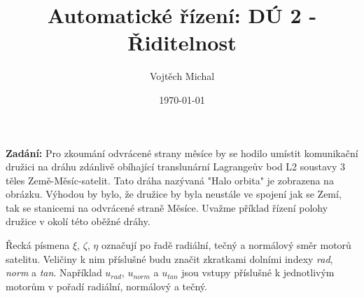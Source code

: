 \documentclass[twoside]{article}
\title{Automatické řízení: DÚ 2 - Řiditelnost}
\author{Vojtěch Michal}
\date{\today}
\begin{document}
\maketitle


\newcommand{\rad}{{rad}}
\renewcommand{\norm}{{norm}}
\renewcommand{\tan}{{tan}}

\textbf{Zadání:}
Pro zkoumání odvrácené strany měsíce by se hodilo umístit komunikační družici na dráhu zdánlivě obíhající
translunární Lagrangeův bod L2 soustavy 3 těles Země-Měsíc-satelit. Tato dráha nazývaná "Halo orbita" je
zobrazena na obrázku. Výhodou by bylo, že družice by byla neustále ve spojení jak se Zemí, tak se stanicemi
na odvrácené straně Měsíce. Uvažme příklad řízení polohy družice v okolí této oběžné dráhy.

Řecká písmena $\xi$, $\zeta$, $\eta$ označují po řadě radiální, tečný a normálový směr motorů satelitu.
Veličiny k nim příslušné budu značit zkratkami dolními indexy \textit{rad}, \textit{norm} a \textit{tan}.
Například $u_\rad$, $u_\norm$ a $u_\tan$
jsou vstupy příslušné k jednotlivým motorům v pořadí radiální, normálový a tečný.
\end{document}
